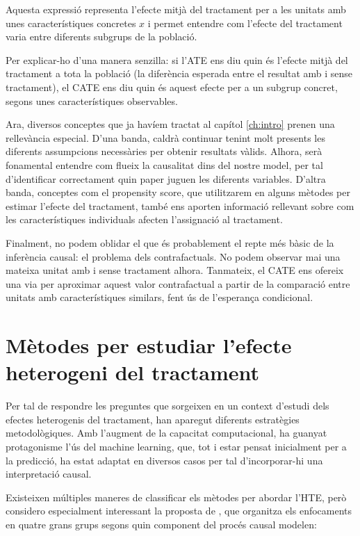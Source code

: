 \documentclass[../main.tex]{subfiles}
\begin{document}
     Aquesta expressió representa l’efecte mitjà del tractament per a les unitats amb unes característiques concretes $x$ i permet entendre com l’efecte del tractament varia entre diferents subgrups de la població.\par
    Per explicar-ho d’una manera senzilla: si l’ATE ens diu quin és l’efecte mitjà del tractament a tota la població (la diferència esperada entre el resultat amb i sense tractament), el CATE ens diu quin és aquest efecte per a un subgrup concret, segons unes característiques observables.\par
    Ara, diversos conceptes que ja havíem tractat al capítol \ref{ch:intro} prenen una rellevància especial. D’una banda, caldrà continuar tenint molt presents les diferents assumpcions necessàries per obtenir resultats vàlids. Alhora, serà fonamental entendre com flueix la causalitat dins del nostre model, per tal d’identificar correctament quin paper juguen les diferents variables. D’altra banda, conceptes com el propensity score, que utilitzarem en alguns mètodes per estimar l’efecte del tractament, també ens aporten informació rellevant sobre com les característiques individuals afecten l’assignació al tractament.\par
    Finalment, no podem oblidar el que és probablement el repte més bàsic de la inferència causal: el problema dels contrafactuals. No podem observar mai una mateixa unitat amb i sense tractament alhora. Tanmateix, el CATE ens ofereix una via per aproximar aquest valor contrafactual a partir de la comparació entre unitats amb característiques similars, fent ús de l’esperança condicional.




    \section{Mètodes per estudiar l'efecte heterogeni del tractament} \label{sec:metodes}
    Per tal de respondre les preguntes que sorgeixen en un context d’estudi dels efectes heterogenis del tractament, han aparegut diferents estratègies metodològiques. Amb l’augment de la capacitat computacional, ha guanyat protagonisme l’ús del machine learning, que, tot i estar pensat inicialment per a la predicció, ha estat adaptat en diversos casos per tal d’incorporar-hi una interpretació causal.\par
    Existeixen múltiples maneres de classificar els mètodes per abordar l’HTE, però considero especialment interessant la proposta de \cite{lipkovich2023}, que organitza els enfocaments en quatre grans grups segons quin component del procés causal modelen:
    
\end{document}

